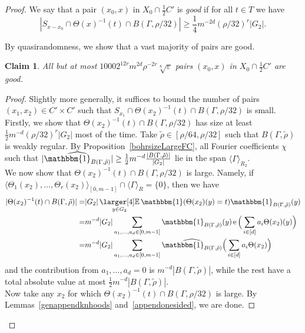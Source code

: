 \documentclass[a4paper,11pt]{article}
\numberwithin{theorem}{section}
\newtheorem{claim}[theorem]{Claim}
\theoremstyle{definition}
\newcommand\id{\mathbbm{1}}
\newcommand{\on}[1]{
	\operatorname{#1}
}
\newcommand{\exx}{
  \mathop{
    \mathchoice{\vcenter{\hbox{\larger[4]$\mathbb{E}$}}}
               {\kern0pt\mathbb{E}}
               {\kern0pt\mathbb{E}}
               {\kern0pt\mathbb{E}}
  }\displaylimits
}
\begin{document}
\begin{proof}
    We say that a pair $(x_0, x)$ in $X_0 \cap \frac{1}{2}C'$ is \emph{good} if for all $t \in T$ we have 
    \begin{equation}
        |S_{x - x_0} \cap \Theta(x)^{-1}(t) \cap B(\Gamma, \rho/32)| \geq \frac{1}{4}m^{-2d} (\rho/32)^{r} |G_2|.\label{gooddefinpair}
    \end{equation}

    By quasirandomness, we show that a vast majority of pairs are good.

    \begin{claim}
        All but at most $1000 2^{12r}m^{2d} \rho^{-2r}\sqrt[8]{\varepsilon}$ pairs $(x_0, x)$ in $X_0 \cap \frac{1}{2}C'$ are good.
    \end{claim}

    \begin{proof}
        Slightly more generally, it suffices to bound the number of pairs $(x_1, x_2) \in C' \times C'$ such that $S_{x_1} \cap \Theta(x_2)^{-1}(t) \cap B(\Gamma, \rho/32)$ is small. Firstly, we show that $\Theta(x_2)^{-1}(t) \cap B(\Gamma, \rho/32)$ has size at least $\frac{1}{2}m^{-d} (\rho/32)^{r} |G_2|$ most of the time. Take $\tilde{\rho} \in [\rho/64, \rho/32]$ such that $B(\Gamma, \tilde{\rho})$ is weakly regular. By Proposition~\ref{bohrsizeLargeFC}, all Fourier coefficients $\chi$ such that $|\widehat{\id_{B(\Gamma, \tilde{\rho})}}| \geq \frac{1}{2}m^{-d}\frac{|B(\Gamma, \tilde{\rho})|}{|G_2|}$ lie in the span $\langle \Gamma\rangle_{R_2}$.\\
        
        We now show that $\Theta(x_2)^{-1}(t) \cap B(\Gamma, \rho/32)$ is large. Namely, if $\langle\Theta_1(x_2), \dots, \Theta_r(x_2) \rangle_{[0, m-1]} \cap \langle \Gamma \rangle_R = \{0\}$, then we have
        \begin{align*}|\Theta(x_2)^{-1}(t) \cap B(\Gamma, \tilde{\rho})| = &|G_2| \exx_{y \in G_2} \id(\Theta(x_2)(y) = t) \id_{B(\Gamma, \tilde{\rho})}(y) \\
        =  &m^{-d} |G_2|\sum_{a_1, \dots, a_d \in [0, m-1]} \id_{B(\Gamma, \tilde{\rho})}(y) \on{e}\Big(\sum_{i \in [d]} a_i \Theta(x_2)( y)\Big) \\
        =& m^{-d} |G_2| \sum_{a_1, \dots, a_d \in [0, m-1]} \widehat{\id_{B(\Gamma, \tilde{\rho})}}\Big(\sum_{i \in [d]} a_i \Theta(x_2)\Big)\end{align*}
        and the contribution from $a_1, \dots, a_d = 0$ is $m^{-d} |B(\Gamma, \tilde{\rho})|$, while the rest have a total absolute value at most $\frac{1}{2}m^{-d} |B(\Gamma, \tilde{\rho})|$.\\
        Now take any $x_2$ for which $\Theta(x_2)^{-1}(t) \cap B(\Gamma, \rho/32)$ is large. By Lemmas~\ref{genappendknhoods} and~\ref{appendonesided}, we are done.
    \end{proof}


\end{proof}
\end{document}
